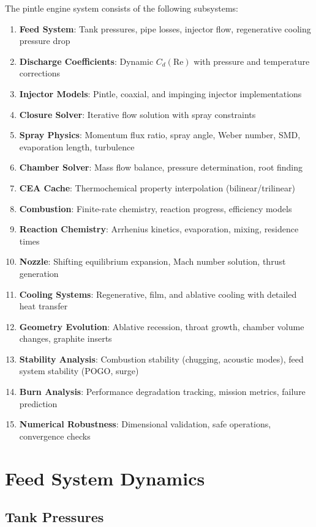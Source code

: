 \documentclass[12pt,a4paper]{article}
\begin{document}
The pintle engine system consists of the following subsystems:
\begin{enumerate}
    \item \textbf{Feed System}: Tank pressures, pipe losses, injector flow, regenerative cooling pressure drop
    \item \textbf{Discharge Coefficients}: Dynamic $C_d(\text{Re})$ with pressure and temperature corrections
    \item \textbf{Injector Models}: Pintle, coaxial, and impinging injector implementations
    \item \textbf{Closure Solver}: Iterative flow solution with spray constraints
    \item \textbf{Spray Physics}: Momentum flux ratio, spray angle, Weber number, SMD, evaporation length, turbulence
    \item \textbf{Chamber Solver}: Mass flow balance, pressure determination, root finding
    \item \textbf{CEA Cache}: Thermochemical property interpolation (bilinear/trilinear)
    \item \textbf{Combustion}: Finite-rate chemistry, reaction progress, efficiency models
    \item \textbf{Reaction Chemistry}: Arrhenius kinetics, evaporation, mixing, residence times
    \item \textbf{Nozzle}: Shifting equilibrium expansion, Mach number solution, thrust generation
    \item \textbf{Cooling Systems}: Regenerative, film, and ablative cooling with detailed heat transfer
    \item \textbf{Geometry Evolution}: Ablative recession, throat growth, chamber volume changes, graphite inserts
    \item \textbf{Stability Analysis}: Combustion stability (chugging, acoustic modes), feed system stability (POGO, surge)
    \item \textbf{Burn Analysis}: Performance degradation tracking, mission metrics, failure prediction
    \item \textbf{Numerical Robustness}: Dimensional validation, safe operations, convergence checks
\end{enumerate}

\section{Feed System Dynamics}

\subsection{Tank Pressures}
\end{document}
